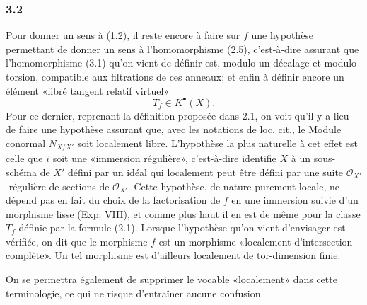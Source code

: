 \documentclass[11pt]{article}
\begin{document}
\subsubsection*{3.2}
Pour donner un sens à (1.2), il reste encore à faire sur $f$ une hypothèse permettant de donner un sens à l'homomorphisme (2.5), c'est-à-dire assurant que l'homomorphisme (3.1) qu'on vient de définir est, modulo un décalage et modulo torsion, compatible aux filtrations de ces anneaux; et enfin à définir encore un élément «fibré tangent relatif virtuel»
\[
T_f\in K^\bullet(X).
\]
Pour ce dernier, reprenant la définition proposée dans 2.1, on voit qu'il y a lieu de faire une hypothèse assurant que, avec les notations de loc. cit., le Module conormal $N_{X/X'}$ soit localement libre. L'hypothèse la plus naturelle à cet effet est celle que $i$ soit une «immersion régulière», c'est-à-dire identifie $X$ à un sous-schéma de $X'$ défini par un idéal qui localement peut être défini par une suite $\mathcal O_{X'}$-régulière de sections de $\mathcal O_{X'}$. Cette hypothèse, de nature purement locale, ne dépend pas en fait du choix de la factorisation de $f$ en une immersion suivie d'un morphisme lisse (Exp. VIII), et comme plus haut il en est de même pour la classe $T_f$ définie par la formule (2.1). Lorsque l'hypothèse qu'on vient d'envisager est vérifiée, on dit que le morphisme $f$ est un morphisme «localement d'intersection complète». Un tel morphisme est d'ailleurs localement de tor-dimension finie.

On se permettra également de supprimer le vocable «localement» dans cette terminologie, ce qui ne risque d'entraîner aucune confusion.
\end{document}
